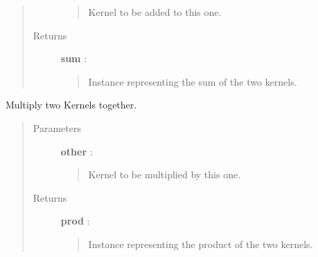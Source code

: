 \documentclass[letterpaper,10pt,english]{sphinxmanual}
\begin{document}
\begin{fulllineitems}
\begin{fulllineitems}
\begin{quote}
\begin{description}
\begin{quote}
Kernel to be added to this one.
\end{quote}

\item[{Returns}] \leavevmode
\textbf{sum} : {\hyperref[gptools.kernel:gptools.kernel.core.SumKernel]{}}
\begin{quote}

Instance representing the sum of the two kernels.
\end{quote}

\end{description}\end{quote}

\end{fulllineitems}


\begin{fulllineitems}
\label{gptools.kernel:gptools.kernel.core.Kernel.__mul__}
Multiply two Kernels together.
\begin{quote}\begin{description}
\item[{Parameters}] \leavevmode
\textbf{other} : {\hyperref[gptools.kernel:gptools.kernel.core.Kernel]{}}
\begin{quote}

Kernel to be multiplied by this one.
\end{quote}

\item[{Returns}] \leavevmode
\textbf{prod} : {\hyperref[gptools.kernel:gptools.kernel.core.ProductKernel]{}}
\begin{quote}

Instance representing the product of the two kernels.
\end{quote}

\end{description}\end{quote}

\end{fulllineitems}


\end{fulllineitems}

\end{document}
